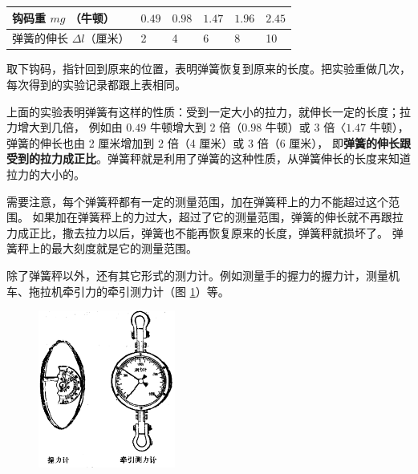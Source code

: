 \begin{table}[H]
    \centering
    \renewcommand\arraystretch{1.5}
    \begin{tabular}{|w{c}{11em}|*{5}{w{c}{4em}|}}
        \hline
        钩码重 $mg$ （牛顿） & $0.49$ & $0.98$ & $1.47$ & $1.96$ & $2.45$  \\ \hline
        弹簧的伸长 $\Delta l$（厘米） & 2 & 4 & 6 & 8 & 10 \\ \hline
    \end{tabular}
\end{table}

取下钩码，指针回到原来的位置，表明弹簧恢复到原来的长度。把实验重做几次，每次得到的实验记录都跟上表相同。

上面的实验表明弹簧有这样的性质：受到一定大小的拉力，就伸长一定的长度；拉力增大到几倍，
例如由 $0.49$ 牛顿增大到 2 倍（$0.98$ 牛顿）或 3 倍〈$1.47$ 牛顿），弹簧的伸长也由 2 厘米增加到 2 倍（4 厘米）或 3 倍（6 厘米），
即\textbf{弹簧的伸长跟受到的拉力成正比}。弹簧秤就是利用了弹簧的这种性质，从弹簧伸长的长度来知道拉力的大小的。

需要注意，每个弹簧秤都有一定的测量范围，加在弹簧秤上的力不能超过这个范围。
如果加在弹簧秤上的力过大，超过了它的测量范围，弹簧的伸长就不再跟拉力成正比，撒去拉力以后，弹簧也不能再恢复原来的长度，弹簧秤就损坏了。
弹簧秤上的最大刻度就是它的测量范围。

除了弹簧秤以外，还有其它形式的测力计。例如测量手的握力的握力计，测量机车、拖拉机牵引力的牵引测力计（图 \ref{fig:2-9}）等。

\begin{figure}[htbp]
    \centering
    \includegraphics[width=0.4\textwidth]{../pic/czwl1-ch2-9}
    \caption{}\label{fig:2-9}
\end{figure}


